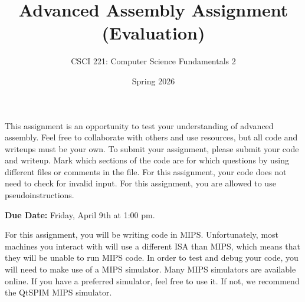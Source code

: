 \documentclass{exam}
\begin{document}
\title{Advanced Assembly Assignment (Evaluation)}
\author{CSCI 221: Computer Science Fundamentals 2}
\date{Spring 2026}
\maketitle


This assignment is an opportunity to test your understanding of advanced assembly. 
Feel free to collaborate with others and use resources, but all code and writeups must be your own. 
To submit your assignment, please submit your code and writeup. 
Mark which sections of the code are for which questions by using different files or comments in the file. 
For this assignment, your code does not need to check for invalid input. 
For this assignment, you are allowed to use pseudoinstructions. 

\textbf{Due Date:}
Friday, April 9th at 1:00 pm. 

For this assignment, you will be writing code in MIPS. 
Unfortunately, most machines you interact with will use a different ISA than MIPS, which means that they will be unable to run MIPS code. 
In order to test and debug your code, you will need to make use of a MIPS simulator. 
Many MIPS simulators are available online. 
If you have a preferred simulator, feel free to use it. 
If not, we recommend the QtSPIM MIPS simulator. 
\end{document}
